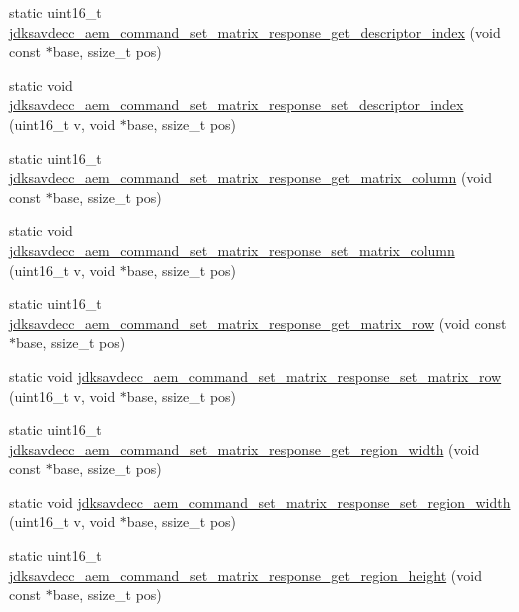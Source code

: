 \begin{DoxyCompactItemize}
\item 
static uint16\+\_\+t \hyperlink{group__command__set__matrix__response_ga5775a3ade1a18bc00c578a8071349df0}{jdksavdecc\+\_\+aem\+\_\+command\+\_\+set\+\_\+matrix\+\_\+response\+\_\+get\+\_\+descriptor\+\_\+index} (void const $\ast$base, ssize\+\_\+t pos)
\item 
static void \hyperlink{group__command__set__matrix__response_ga312457f9e3f65242ca3fbc242e894e05}{jdksavdecc\+\_\+aem\+\_\+command\+\_\+set\+\_\+matrix\+\_\+response\+\_\+set\+\_\+descriptor\+\_\+index} (uint16\+\_\+t v, void $\ast$base, ssize\+\_\+t pos)
\item 
static uint16\+\_\+t \hyperlink{group__command__set__matrix__response_ga90cf3cd8bdb1bbf14c48d7ad650195cf}{jdksavdecc\+\_\+aem\+\_\+command\+\_\+set\+\_\+matrix\+\_\+response\+\_\+get\+\_\+matrix\+\_\+column} (void const $\ast$base, ssize\+\_\+t pos)
\item 
static void \hyperlink{group__command__set__matrix__response_ga16f2df6027e6d88a6a8874ff919d209f}{jdksavdecc\+\_\+aem\+\_\+command\+\_\+set\+\_\+matrix\+\_\+response\+\_\+set\+\_\+matrix\+\_\+column} (uint16\+\_\+t v, void $\ast$base, ssize\+\_\+t pos)
\item 
static uint16\+\_\+t \hyperlink{group__command__set__matrix__response_gafa23da957d106f88f1ffcc7d56eb2330}{jdksavdecc\+\_\+aem\+\_\+command\+\_\+set\+\_\+matrix\+\_\+response\+\_\+get\+\_\+matrix\+\_\+row} (void const $\ast$base, ssize\+\_\+t pos)
\item 
static void \hyperlink{group__command__set__matrix__response_ga431661c873bea7f896d8bfb24f6b2baa}{jdksavdecc\+\_\+aem\+\_\+command\+\_\+set\+\_\+matrix\+\_\+response\+\_\+set\+\_\+matrix\+\_\+row} (uint16\+\_\+t v, void $\ast$base, ssize\+\_\+t pos)
\item 
static uint16\+\_\+t \hyperlink{group__command__set__matrix__response_ga630205a6f85c06c9816b2b3c912f110f}{jdksavdecc\+\_\+aem\+\_\+command\+\_\+set\+\_\+matrix\+\_\+response\+\_\+get\+\_\+region\+\_\+width} (void const $\ast$base, ssize\+\_\+t pos)
\item 
static void \hyperlink{group__command__set__matrix__response_ga98e4b92c9ff485c8573791adfee646cb}{jdksavdecc\+\_\+aem\+\_\+command\+\_\+set\+\_\+matrix\+\_\+response\+\_\+set\+\_\+region\+\_\+width} (uint16\+\_\+t v, void $\ast$base, ssize\+\_\+t pos)
\item 
static uint16\+\_\+t \hyperlink{group__command__set__matrix__response_ga383ad21afe7fccfd0e6656ec5df5d9c6}{jdksavdecc\+\_\+aem\+\_\+command\+\_\+set\+\_\+matrix\+\_\+response\+\_\+get\+\_\+region\+\_\+height} (void const $\ast$base, ssize\+\_\+t pos)

\end{DoxyCompactItemize}
